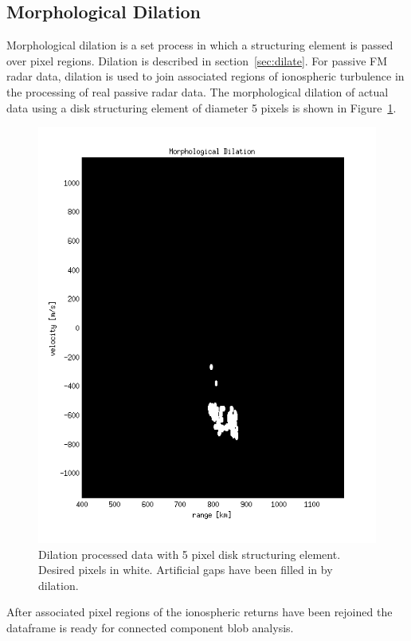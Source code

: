 \subsection{Morphological Dilation}
Morphological dilation is a set process in which a structuring element is passed over pixel regions. 
Dilation is described in section~\ref{sec:dilate}.
For passive FM radar data, dilation is used to join associated regions of ionospheric turbulence in the processing of real passive radar data. 
The morphological dilation of actual data using a disk structuring element of diameter 5 pixels is shown in Figure~\ref{fig:dilateout}. 
\begin{figure}\centering
    \includegraphics[width=\linewidth,trim=0 20 0 20,clip]{gfx/dilateout}
    \caption{Dilation processed data with 5 pixel disk structuring element. Desired pixels in white. Artificial gaps have been filled in by dilation.}\label{fig:dilateout}
\end{figure}
After associated pixel regions of the ionospheric returns have been rejoined the dataframe is ready for connected component blob analysis.


